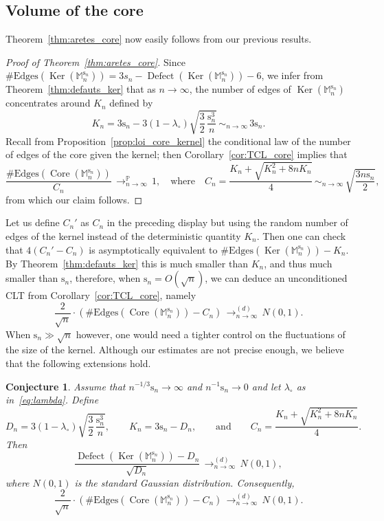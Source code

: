 \documentclass[11pt]{article}
\theoremstyle{plain}
\newtheorem{conjecture}[theorem]{Conjecture}
\theoremstyle{definition}
\theoremstyle{remark}
\renewcommand{\P}{\mathbb{P}}
\newcommand{\Mapb}{\mathbb{M}}
\newcommand{\spar}{\mathrm{s}}
\DeclareMathOperator{\Core}{Core}
\DeclareMathOperator{\Ker}{Ker}
\DeclareMathOperator{\Defect}{Defect}
\newcommand{\cvloi}[1][n]{\,\mathop{\longrightarrow}^{(d)}_{#1 \to \infty}\,}
\newcommand{\cvproba}[1][n]{\,\mathop{\longrightarrow}^{\P}_{#1 \to \infty}\,}
\newcommand{\equi}[1][n]{\,\mathop{\sim}^{}_{#1 \to \infty}\,}
\begin{document}
\subsection{Volume of the core}
\label{ssec:vol_core}

Theorem~\ref{thm:aretes_core} now easily follows from our previous results.

\begin{proof}[Proof of Theorem~\ref{thm:aretes_core}]
Since $\#\mathrm{Edges} (\Ker(\Mapb_n^{\spar_{n}}))=3s_{n}-\Defect(\Ker(\Mapb_n^{\spar_{n}})) -6$, we infer from Theorem~\ref{thm:defauts_ker} that as $n\to\infty$, the number of edges of $\Ker(\Mapb_n^{\spar_{n}})$ concentrates around $K_{n}$ defined by\vspace*{-3pt}
\[
K_n = 3\spar_n - 3 (1-\lambda_{\circ}) \sqrt{\frac{3}{2}\, \frac{\spar_n^3}{n}} \equi 3\spar_n.
\]
Recall from Proposition~\ref{prop:loi_core_kernel} the conditional law of the number of edges of the core given the kernel; then Corollary~\ref{cor:TCL_core} implies that\vspace*{-3pt}
\[
\frac{\#\mathrm{Edges}(\Core(\Mapb_n^{\spar_{n}}))}{C_n} \cvproba 1,
\quad\text{where}\quad
C_n = \frac{K_n + \sqrt{K_n^{2} + 8 n K_n }}{4}
\equi \sqrt{\frac{3 n \spar_n}{2}},
\]
from which our claim follows.
\end{proof}

Let us define $C_n'$ as $C_n$ in the preceding display but using the random number of edges of the kernel instead of the deterministic quantity $K_n$. Then one can check that $4(C_n' - C_n)$ is asymptotically equivalent to $\#\mathrm{Edges}(\Ker(\Mapb_n^{\spar_{n}}))-K_n$. By Theorem~\ref{thm:defauts_ker} this is much smaller than $K_n$, and thus much smaller than $\spar_n$, therefore, when $\spar_n = O(\sqrt{n})$, we can deduce an unconditioned CLT from Corollary~\ref{cor:TCL_core}, namely
\[
\frac{2}{\sqrt{n}} \cdot \left(\#\mathrm{Edges}(\Core(\Mapb_n^{\spar_{n}})) - C_n \right) \cvloi N(0,1).
\]
When $\spar_n \gg \sqrt{n}$ however, one would need a tighter control on the fluctuations of the size of the kernel.
Although our estimates are not precise enough, we believe that the following extensions hold.

\begin{conjecture}\label{conjecture_TCL}
Assume that $n^{-1/3} \spar_n \to \infty$ and $n^{-1} \spar_n \to 0$ and let $\lambda_\circ$ as in~\eqref{eq:lambda}. Define
\[
D_n = 3 (1-\lambda_{\circ}) \sqrt{\frac{3}{2}\, \frac{\spar_n^3}{n}},
\qquad
K_n = 3\spar_n - D_n,
\qquad\text{and}\qquad
C_n = \frac{K_n + \sqrt{K_n^{2} + 8 n K_n }}{4}.
\]
Then
\[
\frac{\Defect(\Ker(\Mapb_n^{\spar_{n}})) - D_n}{\sqrt{D_n}} \cvloi N(0,1),
\]
where $N(0,1)$ is the standard Gaussian distribution. Consequently,
\[
\frac{2}{\sqrt{n}} \cdot \left(\#\mathrm{Edges}(\Core(\Mapb_n^{\spar_{n}})) - C_n \right) \cvloi N(0,1).
\]
\end{conjecture}
\end{document}
